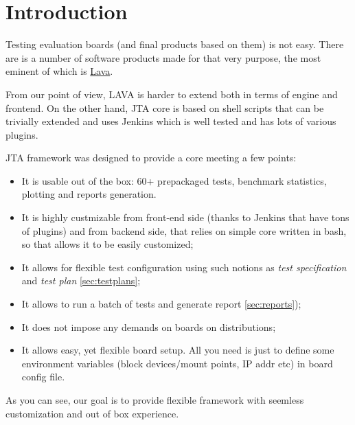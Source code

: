 \section{Introduction}
\label{sec:intro}

Testing evaluation boards (and final products based on them) is not easy. There are is a number of software products made for that very purpose, the most eminent of which is \href{https://wiki.linaro.org/Platform/LAVA}{Lava}.

From our point of view, LAVA is harder to extend both in terms of engine and frontend. On the other hand, JTA core is based on shell scripts that can be trivially extended and uses Jenkins which is well tested and has lots of various plugins.

JTA framework was designed to provide a core meeting a few points:

\begin{itemize}
\item It is usable out of the box: 60+ prepackaged tests, benchmark statistics, plotting and reports generation.
\item It is highly custmizable from front-end side (thanks to Jenkins that have tons of plugins) and from backend side, that relies on simple core written in bash, so that allows it to be easily customized;
\item It allows for flexible test configuration using such notions as \textit{test specification} and \textit{test plan} \ref{sec:testplans};
\item It allows to run a batch of tests and generate report \ref{sec:reports});
\item It does not impose any demands on boards on distributions;
\item It allows easy, yet flexible board setup. All you need is just to define some environment variables (block devices/mount points, IP addr etc) in board config file.
\end{itemize}


As you can see, our goal is to provide flexible framework with seemless customization and out of box experience.

